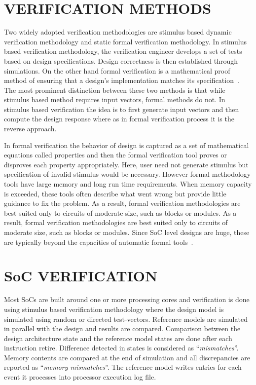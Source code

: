 \section{VERIFICATION METHODS}
Two widely adopted verification methodologies are stimulus based dynamic verification methodology and static formal verification methodology. In stimulus based verification methodology, the verification engineer develops a set of tests based on design specifications. Design correctness is then established through simulations. On the other hand formal verification is a mathematical proof method of ensuring that a design's implementation matches its specification~\citep{ieee:segev:2004}. The most prominent distinction between these two methods is that while stimulus based method requires input vectors, formal methods do not. In stimulus based verification the idea is to first generate input vectors and then compute the design response where as in formal verification process it is the reverse approach.

In formal verification the behavior of design is captured as a set of mathematical equations called properties and then the formal verification tool proves or disproves each property appropriately. Here, user need not generate stimulus but specification of invalid stimulus would be necessary. However formal methodology tools have large memory and long run time requirements.  When memory capacity is exceeded, these tools often describe what went wrong but provide little guidance to fix the problem. As a result, formal verification methodologies are best suited only to circuits of moderate size, such as blocks or modules. As a result, formal verification methodologies are best suited only to circuits of moderate size, such as blocks or modules. Since SoC level designs are huge, these are typically beyond the capacities of automatic formal tools~\citep{ieee:formal:2004}. 

\section{SoC VERIFICATION}
Most SoCs are built around one or more processing cores and verification is done using stimulus based verification methodology where the design model is simulated using random or directed test-vectors. Reference models are simulated in parallel with the design and results are compared.  Comparison between the design architecture state and the reference model states are done after each instruction retire. Difference detected in states is considered as ``{\it mismatches}''. Memory contents are compared at the end of simulation and all discrepancies are reported as ``{\it memory mismatches}''.  The reference model writes entries for each event it processes into processor execution log file.

